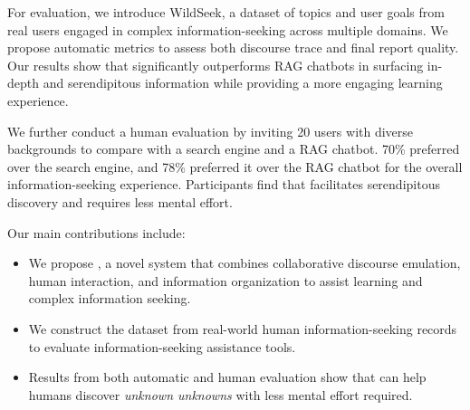 For evaluation, we introduce WildSeek, a dataset of topics and user goals from real users engaged in complex information-seeking across multiple domains. We propose automatic metrics to assess both discourse trace and final report quality. Our results show that \system significantly outperforms RAG chatbots in surfacing in-depth and serendipitous information while providing a more engaging learning experience.%


We further conduct a human evaluation by inviting 20 users with diverse backgrounds to compare \system with a search engine and a RAG chatbot. 70\% preferred \system over the search engine, and 78\% preferred it over the RAG chatbot for the overall information-seeking experience. Participants find that \system facilitates serendipitous discovery and requires less mental effort.%



Our main contributions include:
\begin{itemize}
    \item {We propose \system, a novel system that combines collaborative discourse emulation, human interaction, and information organization to assist learning and complex information seeking.}%
    \item {We construct the \data dataset from real-world human information-seeking records to evaluate information-seeking assistance tools.}
    \item {Results from both automatic and human evaluation show that \system can help humans discover \textit{unknown unknowns} with less mental effort required.}
\end{itemize}